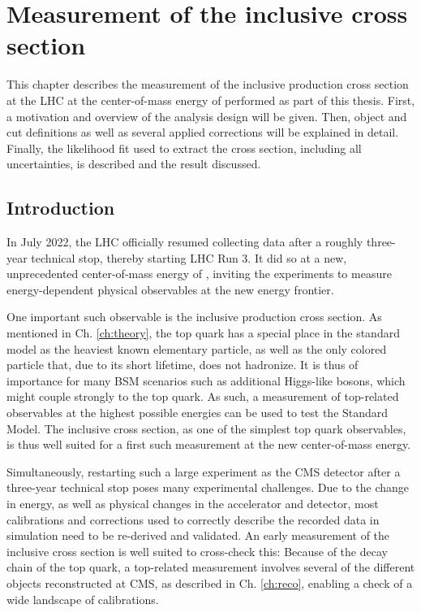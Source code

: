 \chapter{Measurement of the inclusive \ttbar cross section}
\label{ch:ttxs}

This chapter describes the measurement of the inclusive \ttbar production cross section at the LHC at the center-of-mass energy of \sqrtsRIII performed as part of this thesis. First, a motivation and overview of the analysis design will be given. Then, object and cut definitions as well as several applied corrections will be explained in detail. Finally, the likelihood fit used to extract the cross section, including all uncertainties, is described and the result discussed.

\section{Introduction}



In July 2022, the LHC officially resumed collecting data after a roughly three-year technical stop, thereby starting LHC Run 3. It did so at a new, unprecedented center-of-mass energy of \sqrtsRIII, inviting the experiments to measure energy-dependent physical observables at the new energy frontier.

One important such observable is the inclusive \ttbar production cross section. As mentioned in Ch. \ref{ch:theory}, the top quark has a special place in the standard model as the heaviest known elementary particle, as well as the only colored particle that, due to its short lifetime, does not hadronize. It is thus of importance for many BSM scenarios such as additional Higgs-like bosons, which might couple strongly to the top quark. As such, a measurement of top-related observables at the highest possible energies can be used to test the Standard Model. The inclusive \ttbar cross section, as one of the simplest top quark observables, is thus well suited for a first such measurement at the new center-of-mass energy.

Simultaneously, restarting such a large experiment as the CMS detector after a three-year technical stop poses many experimental challenges. Due to the change in energy, as well as physical changes in the accelerator and detector, most calibrations and corrections used to correctly describe the recorded data in simulation need to be re-derived and validated. An early measurement of the inclusive \ttbar cross section is well suited to cross-check this: Because of the decay chain of the top quark, a top-related measurement involves several of the different objects reconstructed at CMS, as described in Ch. \ref{ch:reco}, enabling a check of a wide landscape of calibrations.

